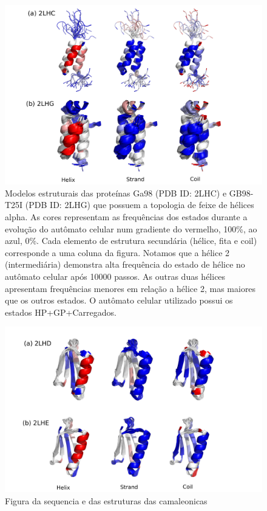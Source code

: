 \begin{figure}
  \centering
  \includegraphics[width=1\textwidth]{figures/camel_2lhc_2lhg.pdf}
  \caption{Modelos estruturais das proteínas Ga98 (PDB ID: 2LHC) e GB98-T25I (PDB ID: 2LHG) que possuem a topologia de feixe de hélices alpha. As cores representam as frequências dos estados durante a evolução do autômato celular num gradiente do vermelho, 100\%, ao azul, 0\%. Cada elemento de estrutura secundária (hélice, fita e coil) corresponde a uma coluna da figura. Notamos que a hélice 2 (intermediária) demonstra alta frequência do estado de hélice no autômato celular após 10000 passos. As outras duas hélices apresentam frequências menores em relação a hélice 2, mas maiores que os outros estados. O autômato celular utilizado possui os estados HP+GP+Carregados.}
        \label{fig:camel_2lhc_2lhg}
\end{figure}

\begin{figure}
  \centering
  \includegraphics[width=1\textwidth]{figures/camel_2lhd_2lhe.pdf}
  \caption{Figura da sequencia e das estruturas das camaleonicas}
        \label{fig:camel_2lhd_2lhe}
\end{figure}


